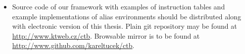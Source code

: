\documentclass[12pt,a4paper,usenames]{report}
\let\openright=\clearpage
\begin{document}



\tableofcontents

\setlength{\parskip}{4mm plus6mm minus2mm}







\listoffigures



\begin{itemize}
  \item Source code of our framework with examples of instruction tables and example implementations of alias environments should be distributed along with electronic version of this thesis. Plain git repository may be found at \url{http://www.ktweb.cz/ctb}. Browsable mirror is to be found at \url{http://www.github.com/kareltucek/ctb}. 
\end{itemize}

\openright
\end{document}
